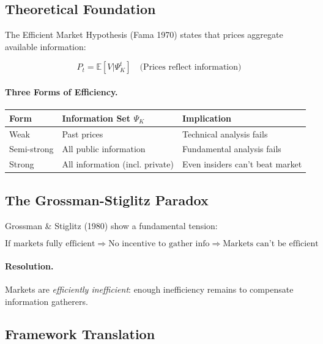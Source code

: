 \subsection{Theoretical Foundation}

The Efficient Market Hypothesis (Fama 1970) states that prices aggregate
available information:

\begin{equation}
\boxed{
P_t = \mathbb{E}[V | \Psi_K^t] \quad \text{(Prices reflect information)}
}
\label{eq:emh}
\end{equation}

\paragraph{Three Forms of Efficiency.}
\begin{center}
\renewcommand{\arraystretch}{1.3}
\begin{tabular}{|l|l|l|}
\hline
\textbf{Form} & \textbf{Information Set $\Psi_K$} & \textbf{Implication} \\
\hline
Weak & Past prices & Technical analysis fails \\
Semi-strong & All public information & Fundamental analysis fails \\
Strong & All information (incl. private) & Even insiders can't beat market \\
\hline
\end{tabular}
\end{center}

\subsection{The Grossman-Stiglitz Paradox}

Grossman \& Stiglitz (1980) show a fundamental tension:

\begin{equation}
\boxed{
\text{If markets fully efficient} \Rightarrow \text{No incentive to gather info}
\Rightarrow \text{Markets can't be efficient}
}
\label{eq:gs-paradox}
\end{equation}

\paragraph{Resolution.}
Markets are \textit{efficiently inefficient}: enough inefficiency remains to
compensate information gatherers.

\subsection{Framework Translation}

